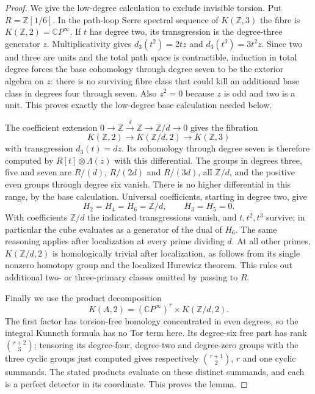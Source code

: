 \begin{proof}
We give the low-degree calculation to exclude invisible torsion.
Put $R=\mathbb Z[1/6]$. In the path-loop Serre spectral sequence of
$K(\mathbb Z,3)$ the fibre is $K(\mathbb Z,2)=\mathbb CP^\infty$.
If $t$ has degree two, its transgression is the degree-three
generator $z$. Multiplicativity gives
$d_3(t^2)=2tz$ and $d_3(t^3)=3t^2z$.
Since two and three are units and the total path space is
contractible, induction in total degree forces the base cohomology
through degree seven to be the exterior algebra on $z$:
there is no surviving fibre class that could kill an additional
base class in degrees four through seven. Also $z^2=0$ because
$z$ is odd and two is a unit. This proves exactly the low-degree
base calculation needed below.

The coefficient extension
$0\to\mathbb Z\xrightarrow{d}\mathbb Z\to\mathbb Z/d\to0$
gives the fibration
\[
 K(\mathbb Z,2)\longrightarrow K(\mathbb Z/d,2)
 \longrightarrow K(\mathbb Z,3)
\]
with transgression $d_3(t)=dz$. Its cohomology through degree seven
is therefore computed by $R[t]\otimes\Lambda(z)$ with this
 differential. The groups in degrees three, five and seven are
$R/(d)$, $R/(2d)$ and $R/(3d)$, all $\mathbb Z/d$, and the positive even
groups through degree six vanish. There is no higher differential
in this range, by the base calculation. Universal coefficients,
starting in degree two, give
\[
 H_2=H_4=H_6=\mathbb Z/d,\qquad H_3=H_5=0.
\]
With coefficients $\mathbb Z/d$ the indicated transgressions vanish,
and $t,t^2,t^3$ survive; in particular the cube evaluates as a
generator of the dual of $H_6$. The same reasoning applies after
localization at every prime dividing $d$. At all other primes,
$K(\mathbb Z/d,2)$ is homologically trivial after localization,
as follows from its single nonzero homotopy group and the localized
Hurewicz theorem. This rules out additional two- or three-primary
classes omitted by passing to $R$.

Finally we use the product decomposition
\[
 K(A,2)=(\mathbb CP^\infty)^r\times K(\mathbb Z/d,2).
\]
The first factor has torsion-free homology concentrated in even
degrees, so the integral Kunneth formula has no Tor term here.
Its degree-six free part has rank $\binom{r+2}{3}$; tensoring its
degree-four, degree-two and degree-zero groups with the three
cyclic groups just computed gives respectively
$\binom{r+1}{2}$, $r$ and one cyclic summands. The stated products
evaluate on these distinct summands, and each is a perfect
detector in its coordinate. This proves the lemma.
\end{proof}
